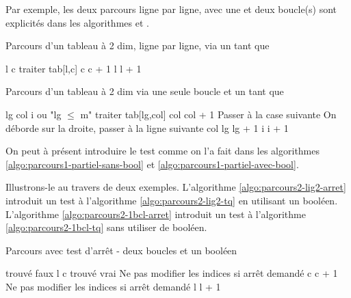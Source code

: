 Par exemple, les deux parcours ligne par ligne, avec une et deux boucle(s)
sont explicités dans les algorithmes \label{algo:parcours2-lig-tq}
et \label{algo:parcours2-1bcl-tq}.

\begin{algorithm}[H]
\begin{pseudo}
	\caption{Parcours d'un tableau à 2 dim, ligne par ligne, via un tant que}
	\label{algo:parcours2-lig2-tq}
	\Let l 
		\Let c 
			\Stmt traiter tab[l,c]
			\Let c \Gets c + 1
		\EndWhile
		\Let l \Gets l + 1
	\EndWhile
\end{pseudo}
\end{algorithm}

\begin{algorithm}[H]
\begin{pseudo}
	\caption{Parcours d'un tableau à 2 dim via une seule boucle et un tant que}
	\label{algo:parcours2-1bcl-tq}
	\Let lg 
	\Let col 
	\Let i 
	 \RComment ou "lg $\le$ m" 
		\Stmt traiter tab[lg,col]
		\Let col \Gets col + 1	\RComment Passer à la case suivante
		 \RComment On déborde sur la droite, passer à la ligne suivante
			\Let col 
			\Let lg \Gets lg + 1
		\EndIf
		\Let i \Gets i + 1		
	\EndWhile
\end{pseudo}
\end{algorithm}

On peut à présent introduire le test comme on l'a fait 
dans les algorithmes \vref{algo:parcours1-partiel-sans-bool}
et \vref{algo:parcours1-partiel-avec-bool}.

Illustrons-le au travers de deux exemples.
L'algorithme \vref{algo:parcours2-lig2-arret} introduit un test 
à l'algorithme \vref{algo:parcours2-lig2-tq} en utilisant un booléen.
L'algorithme \vref{algo:parcours2-1bcl-arret} introduit un test
à l'algorithme \vref{algo:parcours2-1bcl-tq} sans utiliser de booléen.

\begin{algorithm}[H]
\begin{pseudo}
	\caption{Parcours avec test d'arrêt - deux boucles et un booléen}
	\label{algo:parcours2-lig2-arret}
	\Let trouvé \Gets faux
	\Let l 
		\Let c 
				\Let trouvé \Gets vrai
			\Else \RComment Ne pas modifier les indices si arrêt demandé
				\Let c \Gets c + 1
			\EndIf
		\EndWhile
		 \RComment Ne pas modifier les indices si arrêt demandé
			\Let l \Gets l + 1
		\EndIf
	\EndWhile
\end{pseudo}
\end{algorithm}

